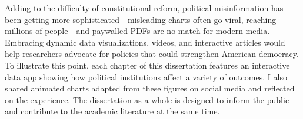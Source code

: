 Adding to the difficulty of constitutional reform, political misinformation has been getting more sophisticated—misleading charts often go viral, reaching millions of people—and paywalled PDFs are no match for modern media. Embracing dynamic data visualizations, videos, and interactive articles would help researchers advocate for policies that could strengthen American democracy. To illustrate this point, each chapter of this dissertation features an interactive data app showing how political institutions affect a variety of outcomes. I also shared animated charts adapted from these figures on social media and reflected on the experience. The dissertation as a whole is designed to inform the public and contribute to the academic literature at the same time.


